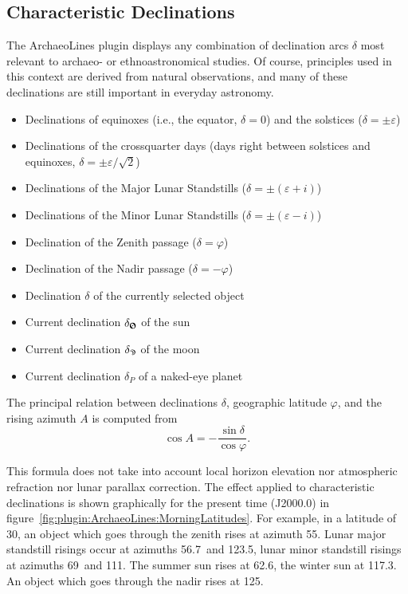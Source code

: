 \subsection{Characteristic Declinations}
\label{sec:plugin:ArchaeoLines:Declinations}


The ArchaeoLines plugin displays any combination of declination arcs $\delta$ most
relevant to archaeo- or ethnoastronomical studies. Of course, principles
used in this context are derived from natural observations, and many of
these declinations are still important in everyday astronomy.

\begin{itemize}
\item Declinations of equinoxes (i.e., the equator, $\delta=0$) and the solstices ($\delta=\pm\varepsilon$)
\item Declinations of the crossquarter days (days right between solstices and equinoxes, $\delta=\pm\varepsilon/\sqrt2$)
\item Declinations of the Major Lunar Standstills ($\delta=\pm(\varepsilon+i)$)
\item Declinations of the Minor Lunar Standstills ($\delta=\pm(\varepsilon-i)$)
\item Declination of the Zenith passage ($\delta=\varphi$)
\item Declination of the Nadir passage ($\delta=-\varphi$)
\item Declination $\delta$ of the currently selected object 
\item Current declination $\delta_{\text{\Sun}}$ of the sun
\item Current declination $\delta_{\text{\Moon}}$ of the moon
\item Current declination $\delta_P$ of a naked-eye planet
\end{itemize}

The principal relation between declinations $\delta$, geographic
latitude $\varphi$, and the rising azimuth $A$ is computed from
\begin{equation}
  \label{eq:RisingAzimuth}
  \cos A=-\frac{\sin\delta}{\cos\varphi}.
\end{equation}

This formula does not take into account local horizon elevation nor
atmospheric refraction nor lunar parallax correction.  The effect
applied to characteristic declinations is shown graphically for the
present time (J2000.0) in
figure~\ref{fig:plugin:ArchaeoLines:MorningLatitudes}. For example, in
a latitude of 30\degree, an object which goes through the zenith rises
at azimuth 55\degree. Lunar major standstill risings occur at azimuths
56.7\degree\ and 123.5\degree, lunar minor standstill risings at
azimuths 69\degree\ and 111\degree. The summer sun rises at
62.6\degree, the winter sun at 117.3\degree. An object which goes
through the nadir rises at 125\degree.  

